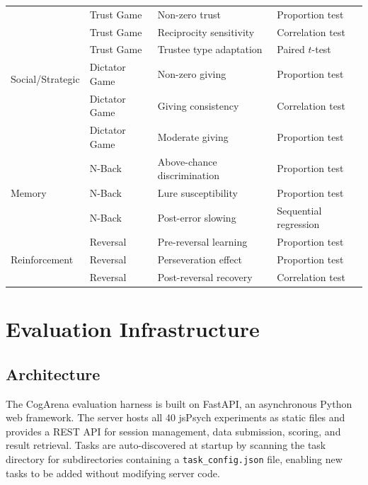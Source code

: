 \documentclass{article}
\begin{document}
\begin{table}[t]
\begin{tabular}{@{}llll@{}}
\midrule
\multirow{6}{*}{Social/Strategic} & Trust Game & Non-zero trust & Proportion test \\
 & Trust Game & Reciprocity sensitivity & Correlation test \\
 & Trust Game & Trustee type adaptation & Paired $t$-test \\
 & Dictator Game & Non-zero giving & Proportion test \\
 & Dictator Game & Giving consistency & Correlation test \\
 & Dictator Game & Moderate giving & Proportion test \\
\midrule
\multirow{3}{*}{Memory} & N-Back & Above-chance discrimination & Proportion test \\
 & N-Back & Lure susceptibility & Proportion test \\
 & N-Back & Post-error slowing & Sequential regression \\
\midrule
\multirow{3}{*}{Reinforcement} & Reversal & Pre-reversal learning & Proportion test \\
 & Reversal & Perseveration effect & Proportion test \\
 & Reversal & Post-reversal recovery & Correlation test \\
\bottomrule
\end{tabular}
\end{table}

\section{Evaluation Infrastructure}
\label{sec:infrastructure}

\subsection{Architecture}

The CogArena evaluation harness is built on FastAPI, an asynchronous Python web framework. The server hosts all 40 jsPsych experiments as static files and provides a REST API for session management, data submission, scoring, and result retrieval. Tasks are auto-discovered at startup by scanning the task directory for subdirectories containing a \texttt{task\_config.json} file, enabling new tasks to be added without modifying server code.
\end{document}
